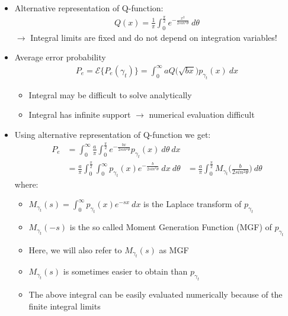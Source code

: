 \documentclass[a4paper, 10pt]{article}
\begin{document}
\begin{itemize}
	\item Alternative representation of Q\;-\;function:
			\begin{align*} 
			Q(x) = \frac{1}{\pi}\int_{0}^{\frac{\pi}{2}} e^{-\frac{x^2}{2sin^2\theta}}~d\theta
			\end{align*}
			$\rightarrow$ Integral limits are fixed and do not depend on integration variables!
	\item Average error probability
		\begin{align*} 
		P_e = \mathcal{E}\bigl \{P_e(\gamma_t)\bigr \} = \int_{0}^{\infty}aQ\bigr (\sqrt{bx}\bigl )p_{\gamma_t}(x)~dx
		\end{align*}
		\begin{itemize}
			\item Integral may be difficult to solve analytically
			\item Integral has infinite support $\rightarrow$ numerical evaluation difficult
		\end{itemize}
	\item Using alternative representation of Q-function we get:
		\begin{align*}
			P_e &= \int_{0}^{\infty}\frac{a}{\pi}\int_{0}^{\frac{\pi}{2}}e^{-\frac{bx}{2sin^2\theta}}p_{\gamma_t}(x)~d\theta ~dx\\
			&= \frac{a}{\pi}\int_{0}^{\frac{\pi}{2}}\int_{0}^{\infty}p_{\gamma_t}(x)e^{-\frac{b}{2sin^2\theta}}~dx~d\theta &= \frac{a}{\pi}\int_{0}^{\frac{\pi}{2}}M_{\gamma_t}\bigl ( \frac{b}{2sin^2\theta} \bigr )~d\theta
		\end{align*}
where:
		\begin{itemize}
				\item $M_{\gamma_t}(s) = \int_{0}^{\infty}p_{\gamma_t}(x)e^{-sx}~dx$ is the Laplace transform of $p_{\gamma_t}$	
				\item $M_{\gamma_t}(-s)$ is the so called Moment Generation Function (MGF) of $p_{\gamma_t}$
				\item Here, we will also refer to $M_{\gamma_t}(s)$ as MGF
				\item $M_{\gamma_t}(s)$ is sometimes easier to obtain than $p_{\gamma_t}$
				\item The above integral can be easily evaluated numerically because of the finite integral limits
			\end{itemize}
\end{itemize}
\end{document}
